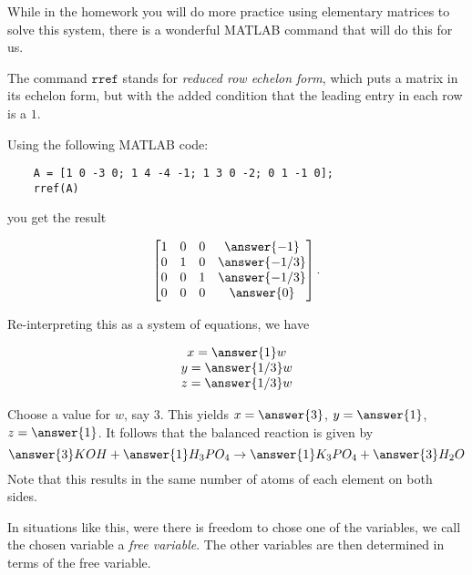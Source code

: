 \documentclass{ximera}
\begin{document}
\begin{exploration}
\begin{example}
\begin{solution}
  While in the homework you will do more practice using elementary matrices to solve this system, there is a wonderful MATLAB command that will do this for us. 

  The command $\texttt{rref}$ stands for \emph{reduced row echelon form}, which puts a matrix in its echelon form, but with the added condition that the leading entry in each row is a $1$.

  Using the following MATLAB code:

  \begin{verbatim}
    A = [1 0 -3 0; 1 4 -4 -1; 1 3 0 -2; 0 1 -1 0];
    rref(A)
  \end{verbatim}

  you get the result

  \begin{equation*}
    \begin{bmatrix}
      1 & 0 & 0 & \answer{-1} \\
      0 & 1 & 0 & \answer{-1/3} \\
      0 & 0 & 1 & \answer{-1/3} \\
      0 & 0 & 0 & \answer{0}
    \end{bmatrix}.
  \end{equation*}

  Re-interpreting this as a system of equations, we have

  \begin{equation*}
    \begin{array}{c}
      x = \answer{1}w \\
      y = \answer{1/3}w \\
      z = \answer{1/3}w \\
    \end{array}
  \end{equation*}

  Choose a value for $w$, say $3$. This yields $x=\answer{3}$, $y=\answer{1}$, $z=\answer{1}$. It follows that the balanced reaction is given by
  \begin{equation*}
    \answer{3}KOH+\answer{1}H_3PO_4\rightarrow \answer{1}K_3PO_4+\answer{3}H_2O
  \end{equation*}
  Note that this results in the same number of atoms of each element
  on both sides.


\begin{remark}

  In situations like this, were there is freedom to chose one of the variables, we call the chosen variable a \emph{free variable}. The other variables are then determined in terms of the free variable.

\end{remark}

\end{solution}

\end{example}

\end{exploration}
\end{document}
